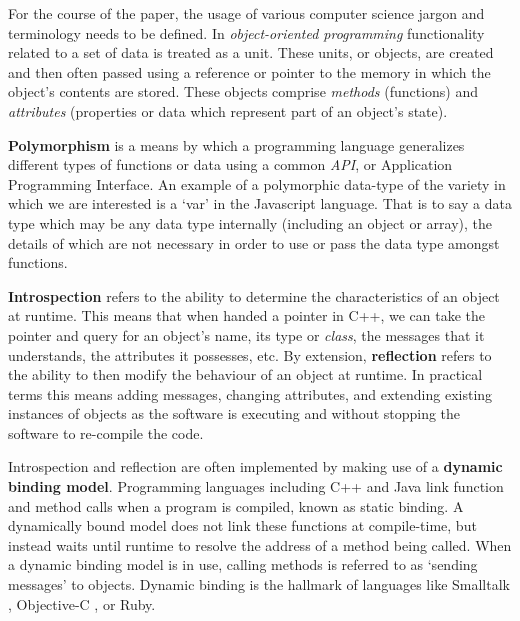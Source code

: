 \documentclass[twoside,10pt]{article}
\begin{document}
For the course of the paper, the usage of various computer science jargon and terminology needs to be defined.  In \emph{object-oriented programming} functionality related to a set of data is treated as a unit.  These units, or objects, are created and then often passed using a reference or pointer to the memory in which the object's contents are stored.  These objects comprise \emph{methods} (functions) and \emph{attributes} (properties or data which represent part of an object's state).

\textbf{Polymorphism} is a means by which a programming language generalizes different types of functions or data using a common \emph{API}, or Application Programming Interface.  An example of a polymorphic data-type of the variety in which we are interested is a `var' in the Javascript language\cite{Flanagan:2002}.  That is to say a data type which may be any data type internally (including an object or array), the details of which are not necessary in order to use or pass the data type amongst functions.

\textbf{Introspection} refers to the ability to determine the characteristics of an object at runtime.  This means that when handed a pointer in C++, we can take the pointer and query for an object's name, its type or \emph{class}, the messages that it understands, the attributes it possesses, etc.  By extension, \textbf{reflection} refers to the ability to then modify the behaviour of an object at runtime\cite{Malenfant:1996}.  In practical terms this means adding messages, changing attributes, and extending existing instances of objects as the software is executing and without stopping the software to re-compile the code.

Introspection and reflection are often implemented by making use of a \textbf{dynamic binding model}.  Programming languages including C++ and Java link function and method calls when a program is compiled, known as static binding.  A dynamically bound model does not link these functions at compile-time, but instead waits until runtime to resolve the address of a method being called.  When a dynamic binding model is in use, calling methods is referred to as `sending messages' to objects. Dynamic binding is the hallmark of languages like Smalltalk \cite{Krasner:1988}, Objective-C \cite{Cox:1986}, or Ruby.
\end{document}
